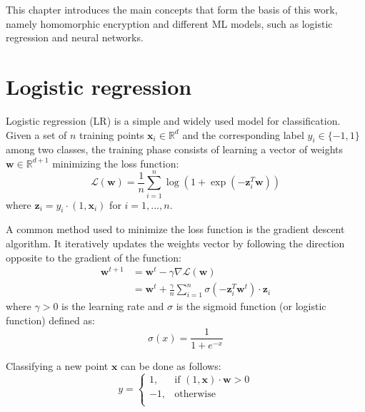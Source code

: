 \documentclass[a4paper,11pt,oneside]{report}
\begin{document}

This chapter introduces the main concepts that form the basis of this work, namely homomorphic encryption and different ML models, such as logistic regression and neural networks.

\section{Logistic regression}

Logistic regression (LR) is a simple and widely used model for classification. 
Given a set of $n$ training points $\mathbf{x}_i \in \mathbb{R}^d$ and the corresponding label $y_i \in \{-1,1\}$ among two classes, the training phase consists of learning a vector of weights $\mathbf{w} \in \mathbb{R}^{d+1}$ minimizing the loss function:
\begin{equation}\label{eq:logistic_reg_train}
    \mathcal{L}(\mathbf{w}) = \frac{1}{n} \sum_{i=1}^{n} \log(1 + \exp(-\mathbf{z}_i^T \mathbf{w})) 
\end{equation}
where $\mathbf{z}_i = y_i \cdot (1, \mathbf{x}_i)$ for $i=1,...,n$.

A common method used to minimize the loss function is the gradient descent algorithm. 
It iteratively updates the weights vector by following the direction opposite to the gradient of the function:
\begin{align}\label{eq:gradient_descent}
    \mathbf{w}^{t+1} & = \mathbf{w}^t - \gamma\nabla\mathcal{L}(\mathbf{w}) \nonumber \\ 
    & = \mathbf{w}^t + \frac{\gamma}{n} \sum_{i=1}^{n} \sigma(-\mathbf{z}_i^T \mathbf{w}^t) \cdot \mathbf{z}_i
\end{align}
where $\gamma > 0$ is the learning rate and $\sigma$ is the sigmoid function (or logistic function) defined as:
\begin{equation}\label{eq:sigmoid}
    \sigma(x) = \frac{1}{1 + e^{-x}}
\end{equation}

Classifying a new point $\mathbf{x}$ can be done as follows:
\begin{equation}\label{eq:logistic_reg_pred}
    y = 
    \begin{cases}
        1, & \text{if } (1, \mathbf{x}) \cdot \mathbf{w} > 0 \\
        -1, & \text{otherwise} \\
    \end{cases}
\end{equation}
\end{document}
